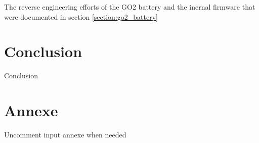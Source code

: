 \documentclass[11pt]{article}
\begin{document}
    The reverse engineering efforts of the GO2 battery and the inernal firmware that were documented in section \ref{section:go2_battery}





\newpage
\section{Conclusion}

    Conclusion     

\newpage

\newpage
{}
\printnoidxglossaries %

\newpage
{}
\listoffigures


\newpage
\section*{Annexe}
Uncomment input annexe when needed
%



    
\end{document}
